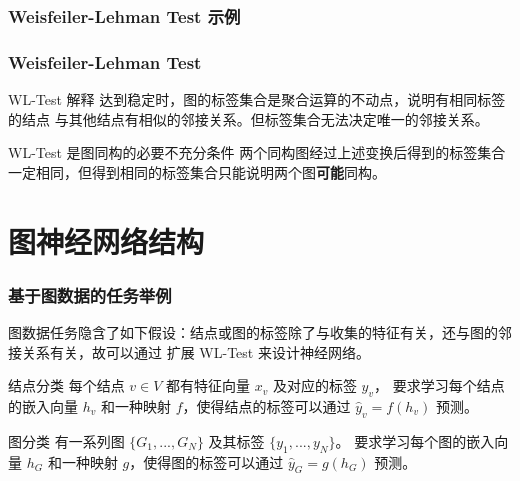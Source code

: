 \documentclass{beamer}
\begin{document}
\begin{frame}

  \frametitle{Weisfeiler-Lehman Test 示例}

\end{frame}

\begin{frame}

  \frametitle{Weisfeiler-Lehman Test}
  \begin{block}{WL-Test 解释}
    达到稳定时，图的标签集合是聚合运算的不动点，说明有相同标签的结点
    与其他结点有相似的邻接关系。但标签集合无法决定唯一的邻接关系。
  \end{block}
  \begin{alertblock}{WL-Test 是图同构的必要不充分条件}
    两个同构图经过上述变换后得到的标签集合一定相同，但得到相同的标签集合只能说明两个图\textbf{可能}同构。
  \end{alertblock}

\end{frame}

\section{图神经网络结构}

\begin{frame}

  \frametitle{基于图数据的任务举例}
  图数据任务隐含了如下假设：结点或图的标签除了与收集的特征有关，还与图的邻接关系有关，故可以通过
  扩展 WL-Test 来设计神经网络。
  \begin{block}{结点分类}
    每个结点 $v \in V$ 都有特征向量 $x_v$ 及对应的标签 $y_v$，
    要求学习每个结点的嵌入向量 $h_v$ 和一种映射 $f$，使得结点的标签可以通过 $\hat{y}_v = f(h_v)$ 预测。
  \end{block}
  \begin{block}{图分类}
    有一系列图 $\{G_1, ..., G_N\}$ 及其标签 $\{y_1, ..., y_N\}$。
    要求学习每个图的嵌入向量 $h_G$ 和一种映射 $g$，使得图的标签可以通过 $\hat{y}_G = g(h_G)$ 预测。
  \end{block}

\end{frame}
\end{document}
